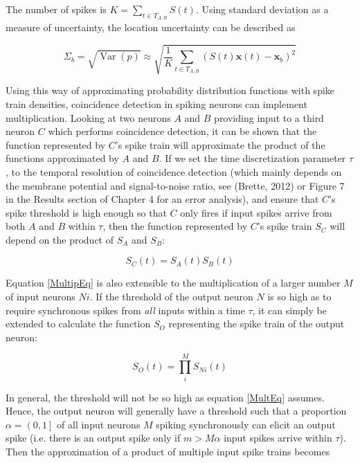 The number of spikes is $K=\sum_{t \in T_{A,B}}{S(t)}$. Using standard deviation as a measure of uncertainty, the location uncertainty can be described as

\begin{equation}\label{BgUnc}
\Sigma_b = \sqrt{\operatorname{Var}(p)} \approx \sqrt{\frac{1}{K} \sum_{t \in T_{A,B}} {(S(t) \boldsymbol x(t) - \boldsymbol x_b)^2} }
\end{equation}

Using this way of approximating probability distribution functions with spike train densities, coincidence detection in spiking neurons can implement multiplication. Looking at two neurons $A$ and $B$ providing input to a third neuron $C$ which performs coincidence detection, it can be shown that the function represented by $C$'s spike train will approximate the product of the functions approximated by $A$ and $B$. If we set the time discretization parameter $\tau$, to the temporal resolution of coincidence detection (which mainly depends on the membrane potential and signal-to-noise ratio, see (Brette, 2012) or Figure 7 in the Results section of Chapter 4 for an error analysis), and ensure that $C$'s spike threshold is high enough so that $C$ only fires if input spikes arrive from both $A$ and $B$ within $ \tau $, then the function represented by $C$'s spike train $ S_{C} $ will depend on the product of $ S_{A} $ and $ S_{B} $:

\begin{equation}\label{MultipEq}
S_{C}(t) = S_{A}(t) S_{B}(t)
\end{equation} 

Equation \eqref{MultipEq} is also extensible to the multiplication of a larger number $ M $ of input neurons $ Ni $. If the threshold of the output neuron $ N $ is so high as to require synchronous spikes from \textit{all} inputs within a time $ \tau $, it can simply be extended to calculate the function $ S_{O} $ representing the spike train of the output neuron:

\begin{equation}\label{MultEq}
S_{O}(t) = \prod_i^M S_{Ni}(t)
\end{equation} 

In general, the threshold will not be so high as equation \eqref{MultEq} assumes. Hence, the output neuron will generally have a threshold such that a proportion $ \alpha=\left( 0, 1 \right] $ of all input neurons $ M $ spiking synchronously can elicit an output spike (i.e. there is an output spike only if $ m > M \alpha $ input spikes arrive within $ \tau $). Then the approximation of a product of multiple input spike trains becomes

